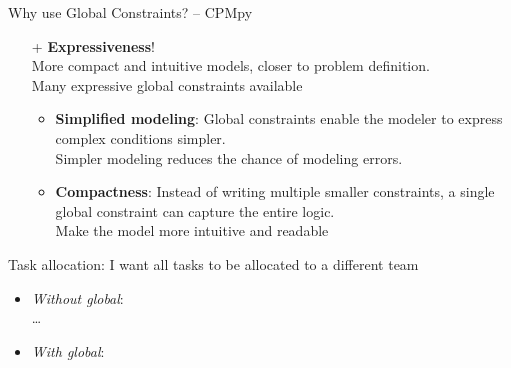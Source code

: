 \documentclass{cons-beamer}
\begin{document}
\begin{flashcardcpmpy}
\begin{frame}{Why use Global Constraints? -- CPMpy}
  \begin{itemize}
    \item[+] \textbf{Expressiveness}! \\ More compact and intuitive models, closer to problem definition. \\ 
             Many expressive global constraints available \vfill
             \begin{itemize}
                \item \textbf{Simplified modeling}: Global constraints enable the modeler to express complex conditions simpler. \\
                      Simpler modeling reduces the chance of modeling errors.

                \item \textbf{Compactness}:  Instead of writing multiple smaller constraints, a single global constraint can capture the entire logic. \\
                      Make the model more intuitive and readable
             \end{itemize}
  \end{itemize}
  \vfill

  \begin{example}
    Task allocation: I want all tasks to be allocated to a different team\\
    \begin{itemize}
      \item \textit{Without global}: \\  \dots \\
      \item \textit{With global}:  
    \end{itemize}
  \end{example}
\end{frame}
\end{flashcardcpmpy}
\end{document}
